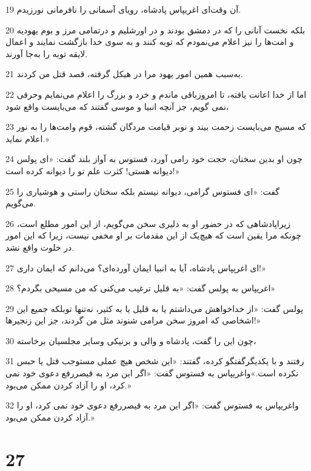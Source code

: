 \par 19 آن وقت‌ای اغریپاس پادشاه، رویای آسمانی را نافرمانی نورزیدم.
\par 20 بلکه نخست آنانی را که در دمشق بودند و در اورشلیم و درتمامی مرز و بوم یهودیه و امت‌ها را نیز اعلام می‌نمودم که توبه کنند و به سوی خدا بازگشت نمایند و اعمال لایقه توبه را به‌جا آورند.
\par 21 به‌سبب همین امور یهود مرا در هیکل گرفته، قصد قتل من کردند.
\par 22 اما از خدا اعانت یافته، تا امروزباقی ماندم و خرد و بزرگ را اعلام می‌نمایم وحرفی نمی گویم، جز آنچه انبیا و موسی گفتند که می‌بایست واقع شود،
\par 23 که مسیح می‌بایست زحمت بیند و نوبر قیامت مردگان گشته، قوم وامت‌ها را به نور اعلام نماید.»
\par 24 چون او بدین سخنان، حجت خود رامی آورد، فستوس به آواز بلند گفت: «ای پولس دیوانه هستی! کثرت علم تو را دیوانه کرده است!»
\par 25 گفت: «ای فستوس گرامی، دیوانه نیستم بلکه سخنان راستی و هوشیاری را می‌گویم.
\par 26 زیراپادشاهی که در حضور او به دلیری سخن می‌گویم، از این امور مطلع است، چونکه مرا یقین است که هیچ‌یک از این مقدمات بر او مخفی نیست، زیرا که این امور در خلوت واقع نشد.
\par 27 ‌ای اغریپاس پادشاه، آیا به انبیا ایمان آورده‌ای؟ می‌دانم که ایمان داری!»
\par 28 اغریپاس به پولس گفت: «به قلیل ترغیب می‌کنی که من مسیحی بگردم؟»
\par 29 پولس گفت: «از خداخواهش می‌داشتم یا به قلیل یا به کثیر، نه‌تنها توبلکه جمیع این اشخاصی که امروز سخن مرامی شنوند مثل من گردند، جز این زنجیرها!»
\par 30 چون این را گفت، پادشاه و والی و برنیکی وسایر مجلسیان برخاسته،
\par 31 رفتند و با یکدیگرگفتگو کرده، گفتند: «این شخص هیچ عملی مستوجب قتل یا حبس نکرده است.»واغریپاس به فستوس گفت: «اگر این مرد به قیصررفع دعوی خود نمی کرد، او را آزاد کردن ممکن می‌بود.»
\par 32 واغریپاس به فستوس گفت: «اگر این مرد به قیصررفع دعوی خود نمی کرد، او را آزاد کردن ممکن می‌بود.»

\chapter{27}

